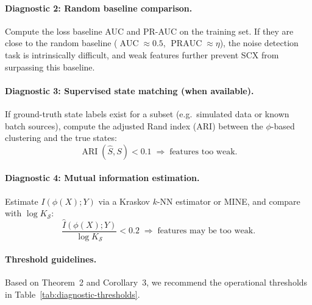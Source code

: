 \paragraph{Diagnostic 2: Random baseline comparison.}
Compute the loss baseline AUC and PR-AUC on the training set. If they are
close to the random baseline ($\operatorname{AUC} \approx 0.5$,
$\operatorname{PRAUC} \approx \eta$), the noise detection task is intrinsically
difficult, and weak features further prevent SCX from surpassing this baseline.

\paragraph{Diagnostic 3: Supervised state matching (when available).}
If ground-truth state labels exist for a subset (e.g.\ simulated data or known
batch sources), compute the adjusted Rand index (ARI) between the $\phi$-based
clustering and the true states:
\[
\operatorname{ARI}(\hat{S}, S) < 0.1 \;\Longrightarrow\; \text{features too weak}.
\]

\paragraph{Diagnostic 4: Mutual information estimation.}
Estimate $I(\phi(X); Y)$ via a Kraskov $k$-NN estimator or MINE, and compare
with $\log K_{\mathcal{S}}$:
\[
\frac{\hat{I}(\phi(X); Y)}{\log K_{\mathcal{S}}} < 0.2
\;\Longrightarrow\; \text{features may be too weak}.
\]

\paragraph{Threshold guidelines.}
Based on Theorem~2 and Corollary~3, we recommend the operational thresholds
in Table~\ref{tab:diagnostic-thresholds}.

